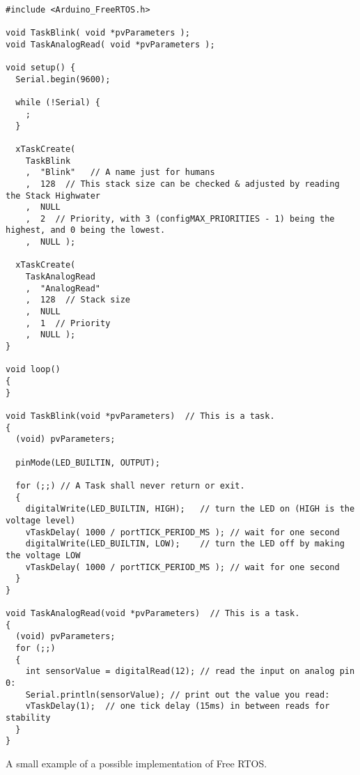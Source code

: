 \begin{listing}[htb!]
\centering
\begin{verbatim}
#include <Arduino_FreeRTOS.h>

void TaskBlink( void *pvParameters );
void TaskAnalogRead( void *pvParameters );

void setup() {
  Serial.begin(9600);
  
  while (!Serial) {
    ;
  }
  
  xTaskCreate(
    TaskBlink
    ,  "Blink"   // A name just for humans
    ,  128  // This stack size can be checked & adjusted by reading the Stack Highwater
    ,  NULL
    ,  2  // Priority, with 3 (configMAX_PRIORITIES - 1) being the highest, and 0 being the lowest.
    ,  NULL );

  xTaskCreate(
    TaskAnalogRead
    ,  "AnalogRead"
    ,  128  // Stack size
    ,  NULL
    ,  1  // Priority
    ,  NULL );
}

void loop()
{
}

void TaskBlink(void *pvParameters)  // This is a task.
{
  (void) pvParameters;

  pinMode(LED_BUILTIN, OUTPUT);

  for (;;) // A Task shall never return or exit.
  {
    digitalWrite(LED_BUILTIN, HIGH);   // turn the LED on (HIGH is the voltage level)
    vTaskDelay( 1000 / portTICK_PERIOD_MS ); // wait for one second
    digitalWrite(LED_BUILTIN, LOW);    // turn the LED off by making the voltage LOW
    vTaskDelay( 1000 / portTICK_PERIOD_MS ); // wait for one second
  }
}

void TaskAnalogRead(void *pvParameters)  // This is a task.
{
  (void) pvParameters;
  for (;;)
  {
    int sensorValue = digitalRead(12); // read the input on analog pin 0:
    Serial.println(sensorValue); // print out the value you read:
    vTaskDelay(1);  // one tick delay (15ms) in between reads for stability
  }
}
\end{verbatim}
\caption{A small example of a possible implementation of Free RTOS.}
\label{List: FreeRTOS Example}
\end{listing}


